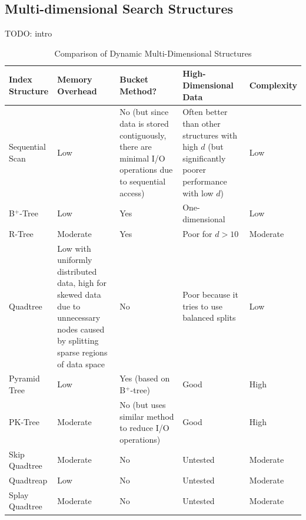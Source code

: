 \begin{landscape}
	\section{Multi-dimensional Search Structures}

	TODO: intro

	\begin{table}[h]
		\centering
		\begin{tabular}{|p{2.8cm}|p{5cm}|p{5cm}|p{5cm}|p{2cm}|}
			\hline
			\textbf{Index Structure} &
			\textbf{Memory Overhead} &
			\textbf{Bucket Method?} &
			\textbf{High-Dimensional Data} &
			\textbf{Complexity} \\
			\hline
			Sequential Scan & Low & No (but since data is stored contiguously, there are minimal I/O operations due to sequential access) & Often better than other structures with high $d$ (but significantly poorer performance with low $d$) & Low \\		
			B${}^{+}$-Tree & Low & Yes & One-dimensional & Low \\
			R-Tree & Moderate & Yes & Poor for $d > 10$ \cite{pyramid-tree} & Moderate \\
			Quadtree & Low with uniformly distributed data, high for skewed data due to unnecessary nodes caused by splitting sparse regions of data space & No & Poor because it tries to use balanced splits \cite{pyramid-tree} & Low \\
			Pyramid Tree & Low & Yes (based on B${}^{+}$-tree) & Good & High \\
			PK-Tree & Moderate & No (but uses similar method to reduce I/O operations) & Good & High \\
			Skip Quadtree & Moderate & No & Untested & Moderate \\
			Quadtreap & Low & No & Untested & Moderate \\
			Splay Quadtree & Moderate & No & Untested & Moderate \\
			\hline
		\end{tabular}
		\caption{Comparison of Dynamic Multi-Dimensional Structures}
		\label{tab:comparison}
	\end{table}


\end{landscape}
